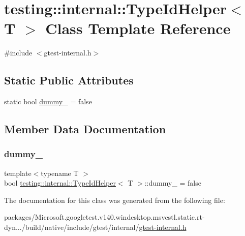 \hypertarget{classtesting_1_1internal_1_1_type_id_helper}{}\section{testing\+::internal\+::Type\+Id\+Helper$<$ T $>$ Class Template Reference}
\label{classtesting_1_1internal_1_1_type_id_helper}


{\ttfamily \#include $<$gtest-\/internal.\+h$>$}

\subsection*{Static Public Attributes}
\begin{DoxyCompactItemize}
\item 
static bool \mbox{\hyperlink{classtesting_1_1internal_1_1_type_id_helper_a372268b1520d965d0bdf01ebad3d270e}{dummy\+\_\+}} = false
\end{DoxyCompactItemize}


\subsection{Member Data Documentation}
\mbox{\label{classtesting_1_1internal_1_1_type_id_helper_a372268b1520d965d0bdf01ebad3d270e}} 
\subsubsection{\texorpdfstring{dummy\_}{dummy\_}}
{\footnotesize\ttfamily template$<$typename T $>$ \\
bool \mbox{\hyperlink{classtesting_1_1internal_1_1_type_id_helper}{testing\+::internal\+::\+Type\+Id\+Helper}}$<$ T $>$\+::dummy\+\_\+ = false\hspace{0.3cm}{\ttfamily [static]}}



The documentation for this class was generated from the following file\+:\begin{DoxyCompactItemize}
\item 
packages/\+Microsoft.\+googletest.\+v140.\+windesktop.\+msvcstl.\+static.\+rt-\/dyn.../build/native/include/gtest/internal/\mbox{\hyperlink{gtest-internal_8h}{gtest-\/internal.\+h}}\end{DoxyCompactItemize}
